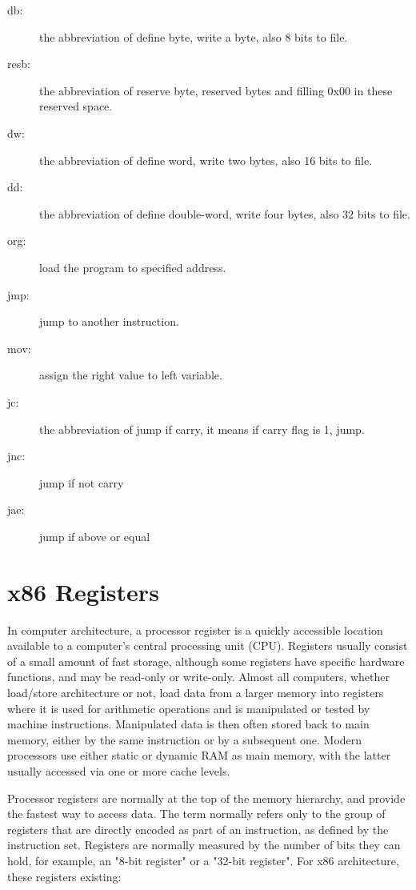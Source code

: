 \documentclass{swfcthesis}
\begin{document}
\begin{description}
\item[db:] the abbreviation of define byte, write a byte, also 8 bits to file.
\item[resb:] the abbreviation of reserve byte, reserved bytes and filling 0x00 in these reserved space.
\item[dw:] the abbreviation of define word, write two bytes, also 16 bits to file.
\item[dd:] the abbreviation of define double-word, write four bytes, also 32 bits to file.
\item[org:] load the program to specified address.
\item[jmp:] jump to another instruction.
\item[mov:] assign the right value to left variable.
\item[jc:] the abbreviation of jump if carry, it means if carry flag is 1, jump.
\item[jnc:] jump if not carry
\item[jae:] jump if above or equal
\end{description}

\section{x86 Registers}
\label{sec:register}

In computer architecture, a processor register is a quickly accessible location available
to a computer's central processing unit (CPU). Registers usually consist of a small amount
of fast storage, although some registers have specific hardware functions, and may be
read-only or write-only.  Almost all computers, whether load/store architecture or not,
load data from a larger memory into registers where it is used for arithmetic operations
and is manipulated or tested by machine instructions. Manipulated data is then often
stored back to main memory, either by the same instruction or by a subsequent one. Modern
processors use either static or dynamic RAM as main memory, with the latter usually
accessed via one or more cache levels.

\par Processor registers are normally at the top of the memory hierarchy, and provide the
fastest way to access data. The term normally refers only to the group of registers that
are directly encoded as part of an instruction, as defined by the instruction
set. Registers are normally measured by the number of bits they can hold, for example, an
"8-bit register" or a "32-bit register". For x86 architecture, these registers existing:
\end{document}
